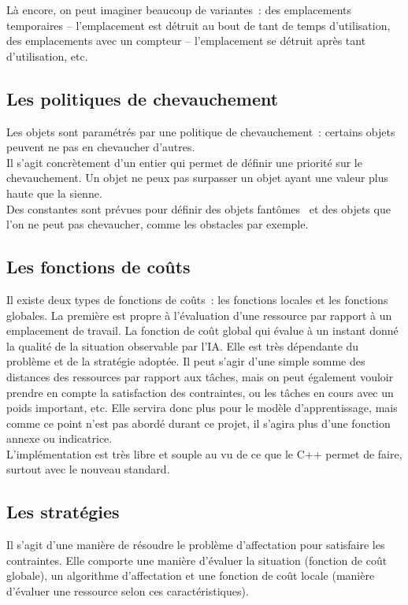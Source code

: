 Là encore, on peut imaginer beaucoup de variantes~: des emplacements temporaires – l'emplacement est détruit au bout de tant de temps d'utilisation, des emplacements avec un compteur – l'emplacement se détruit après tant d'utilisation, etc.

\subsection*{Les politiques de chevauchement}

Les objets sont paramétrés par une politique de chevauchement~: certains objets peuvent ne pas en chevaucher d'autres.\\
\indent Il s'agit concrètement d'un entier qui permet de définir une priorité sur le chevauchement. Un objet ne peux pas surpasser un objet ayant une valeur plus haute que la sienne.\\
\indent Des constantes sont prévues pour définir des objets \og fantômes \fg ~et des objets que l'on ne peut pas chevaucher, comme les obstacles par exemple.

\subsection*{Les fonctions de coûts}

Il existe deux types de fonctions de coûts~: les fonctions locales et les fonctions globales. La première est propre à l'évaluation d'une ressource par rapport à un emplacement de travail.
La fonction de coût global qui évalue à un instant donné la qualité de la situation observable par l'IA. Elle est très dépendante du problème et de la stratégie adoptée. Il peut s'agir d'une simple somme des distances des ressources par rapport aux tâches, mais on peut également vouloir prendre en compte la satisfaction des contraintes, ou les tâches en cours avec un poids important, etc.
Elle servira donc plus pour le modèle d'apprentissage, mais comme ce point n'est pas abordé durant ce projet, il s'agira plus d'une fonction annexe ou indicatrice.\\

L'implémentation est très libre et souple au vu de ce que le C++ permet de faire, surtout avec le nouveau standard.

\subsection*{Les stratégies}

Il s'agit d'une manière de résoudre le problème d'affectation pour satisfaire les contraintes. Elle comporte une manière d'évaluer la situation (fonction de coût globale), un algorithme d'affectation et une fonction de coût locale (manière d'évaluer une ressource selon ces caractéristiques).\\\\

